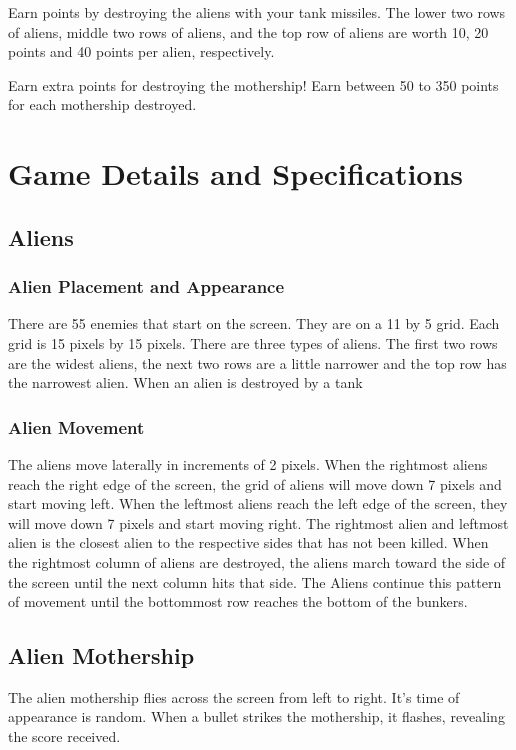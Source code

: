 \documentclass[11pt,letter,oneside]{report}
\begin{document}
Earn points by destroying the aliens with your tank missiles. The lower two rows of aliens, middle two rows of aliens, and the top row of aliens are worth 10, 20 points and 40 points per alien, respectively.

Earn extra points for destroying the mothership! Earn between 50 to 350 points for each mothership destroyed.

\section{Game Details and Specifications}

\subsection{Aliens}

\subsubsection{Alien Placement and Appearance}
There are 55 enemies that start on the screen.  They are on a 11 by 5 grid.  Each grid is 15 pixels by 15 pixels.  There are three types of aliens.  The first two rows are the widest aliens, the next two rows are a little narrower and the top row has the narrowest alien. When an alien is destroyed by a tank

\subsubsection{Alien Movement}
The aliens move laterally in increments of 2 pixels.  When the rightmost aliens reach the right edge of the screen, the grid of aliens will move down 7 pixels and start moving left.  When the leftmost aliens reach the left edge of the screen, they will move down 7 pixels and start moving right.  The rightmost alien and leftmost alien is the closest alien to the respective sides that has not been killed. When the rightmost column of aliens are destroyed, the aliens march toward the side of the screen until the next column hits that side. The Aliens continue this pattern of movement until the bottommost row reaches the bottom of the bunkers. 

\subsection{Alien Mothership}
The alien mothership flies across the screen from left to right. It's time of appearance is random. When a bullet strikes the mothership, it flashes, revealing the score received.
\end{document}
